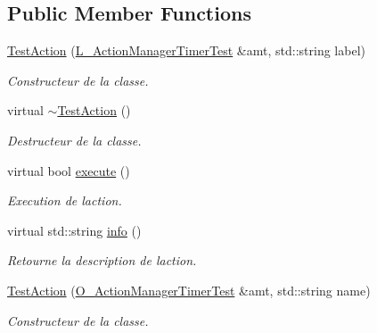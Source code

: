 \subsection*{Public Member Functions}
\begin{DoxyCompactItemize}
\item 
\hyperlink{classTestAction_a0c78e7ef31112cd21832f3f168751ae2}{Test\+Action} (\hyperlink{classL__ActionManagerTimerTest}{L\+\_\+\+Action\+Manager\+Timer\+Test} \&amt, std\+::string label)
\begin{DoxyCompactList}\small\item\em Constructeur de la classe. \end{DoxyCompactList}\item 
\mbox{\label{classTestAction_ae3f7cc56414d35d8160f482efdf806fb}} 
virtual \hyperlink{classTestAction_ae3f7cc56414d35d8160f482efdf806fb}{$\sim$\+Test\+Action} ()
\begin{DoxyCompactList}\small\item\em Destructeur de la classe. \end{DoxyCompactList}\item 
\mbox{\label{classTestAction_abc2406605ef5655ea05fb3eaf2a74051}} 
virtual bool \hyperlink{classTestAction_abc2406605ef5655ea05fb3eaf2a74051}{execute} ()
\begin{DoxyCompactList}\small\item\em Execution de l\textquotesingle{}action. \end{DoxyCompactList}\item 
\mbox{\label{classTestAction_a59dad902e23509086cea9a1adda3224f}} 
virtual std\+::string \hyperlink{classTestAction_a59dad902e23509086cea9a1adda3224f}{info} ()
\begin{DoxyCompactList}\small\item\em Retourne la description de l\textquotesingle{}action. \end{DoxyCompactList}\item 
\hyperlink{classTestAction_a313c6975b35eb2ec170f843caa32bc6f}{Test\+Action} (\hyperlink{classO__ActionManagerTimerTest}{O\+\_\+\+Action\+Manager\+Timer\+Test} \&amt, std\+::string name)
\begin{DoxyCompactList}\small\item\em Constructeur de la classe. \end{DoxyCompactList}\item 

\end{DoxyCompactItemize}
